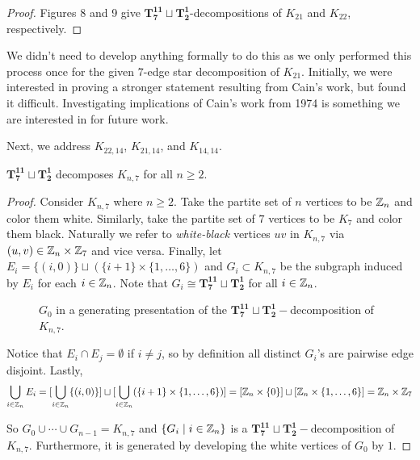 \begin{proof}
     Figures 8 and 9 give $\mathbf{T_{7}^{11}}\sqcup\mathbf{T_{2}^{1}}$-decompositions of $K_{21}$ and $K_{22}$, respectively.%

\end{proof}
We didn't need to develop anything formally to do this as we only performed this process once for the given $7$-edge star decomposition of $K_{21}$. Initially, we were interested in proving a stronger statement resulting from Cain's work, but found it difficult. Investigating implications of Cain's work \cite{Cain1974} from 1974 is something we are interested in for future work.

Next, we address $K_{22,14}$, $K_{21,14}$, and $K_{14,14}$. 
\newpage
\begin{thm} \label{thm:K_n,7}
    $\mathbf{T_{7}^{11}}\sqcup\mathbf{T_{2}^{1}}$ decomposes $K_{n,7}$ for all $n\geq 2$.
\end{thm}

\begin{proof}
    Consider $K_{n,7}$ where $n\geq 2$. Take the partite set of $n$ vertices to be $\mathbb{Z}_{n}$ and color them white. Similarly, take the partite set of $7$ vertices to be $K_{7}$ and color them black. Naturally we refer to \textit{white-black} vertices $uv$ in $K_{n,7}$ via $(u,v)\in \mathbb{Z}_{n}\times\mathbb{Z}_{7}$ and vice versa. Finally, let $E_{i}=\{(i,0)\}\sqcup (\{i+1\}\times \{1,\hdots,6\})$ and $G_{i}\subset K_{n,7}$ be the subgraph induced by $E_{i}$ for each $i\in \mathbb{Z}_{n}$. Note that $G_{i}\cong \mathbf{T_{7}^{11}}\sqcup\mathbf{T_{2}^{1}}$ for all $i\in \mathbb{Z}_{n}$.

    \begin{figure}[H]
        \centering
        
        \caption{$G_{0}$ in a generating presentation of the $\mathbf{T_{7}^{11}}\sqcup\mathbf{T_{2}^{1}}-$decomposition of $K_{n,7}$.}
        \label{fig:starpathbip}
    \end{figure}

    \noindent Notice that $E_{i}\cap E_{j}=\emptyset$ if $i\neq j$, so by definition all distinct $G_{i}$'s are pairwise edge disjoint. Lastly,
    $$\bigcup_{i\in \mathbb{Z}_{n}} E_{i}=[\bigcup_{i\in \mathbb{Z}_{n}} \{(i,0)\}]\sqcup [\bigcup_{i\in \mathbb{Z}_{n}} (\{i+1\}\times \{1,\hdots, 6\})]=[\mathbb{Z}_{n}\times \{0\}]\sqcup [\mathbb{Z}_{n}\times \{1,\hdots, 6\}]=\mathbb{Z}_{n}\times \mathbb{Z}_{7}$$
    
    \noindent So $G_{0}\cup \cdots \cup G_{n-1}=K_{n,7}$ and $\{G_{i}\mid i\in \mathbb{Z}_{n}\}$ is a $\mathbf{T_{7}^{11}}\sqcup\mathbf{T_{2}^{1}}-$decomposition of $K_{n,7}$. Furthermore, it is generated by developing the white vertices of $G_{0}$ by $1$.
\end{proof}

